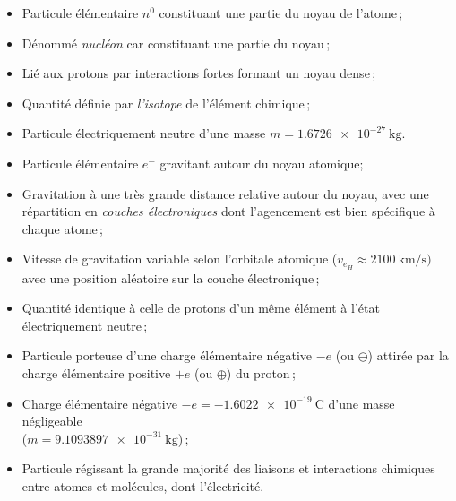 \begin{definition}[Neutron]
		\begin{itemize}
			\item Particule élémentaire $n^0$ constituant une partie du noyau de l'atome\,; %
			\item Dénommé \emph{nucléon} car constituant une partie du noyau\,;
			\item Lié aux protons par interactions fortes formant un noyau dense\,;
			\item Quantité définie par \emph{l'isotope} de l'élément chimique\,; 
			\item Particule électriquement neutre d'une masse $m=\SI{1,6726e-27}{\kilogram}$. %
		\end{itemize}
\end{definition}

\begin{definition}[\'Electron]
		\begin{itemize}
			\item Particule élémentaire $e^-$ gravitant autour du noyau atomique; %
			\item Gravitation à une très grande distance relative autour du noyau, avec une répartition en \emph{couches électroniques} dont l'agencement est bien spécifique à chaque atome\,;
			\item Vitesse de gravitation variable selon l'orbitale atomique ($v_{e^{-}_H}\approx\SI{2100}{\kilo\meter\per\second})$ avec une position aléatoire sur la couche électronique\,; %
			\item Quantité identique à celle de protons d'un même élément à l'état électriquement neutre\,; 
			\item Particule porteuse d'une charge élémentaire négative $-e$ (ou $\ominus$) attirée par la charge élémentaire positive $+e$ (ou $\oplus$) du proton\,; %
			\item Charge élémentaire négative $-e=\SI{-1,6022e-19}{\coulomb}$ d'une masse négligeable\\($m=\SI{9,1093897e-31}{\kilo\gram}$)\,; %
			\item Particule régissant la grande majorité des liaisons et interactions chimiques entre atomes et molécules, dont l'électricité.
		\end{itemize}
\end{definition}

